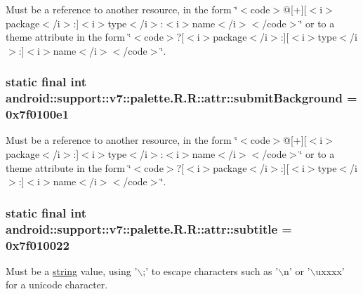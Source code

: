 Must be a reference to another resource, in the form \char`\"{}$<$code$>$@\mbox{[}+\mbox{]}\mbox{[}$<$i$>$package$<$/i$>$:\mbox{]}$<$i$>$type$<$/i$>$:$<$i$>$name$<$/i$>$$<$/code$>$\char`\"{} or to a theme attribute in the form \char`\"{}$<$code$>$?\mbox{[}$<$i$>$package$<$/i$>$:\mbox{]}\mbox{[}$<$i$>$type$<$/i$>$:\mbox{]}$<$i$>$name$<$/i$>$$<$/code$>$\char`\"{}. \hypertarget{classandroid_1_1support_1_1v7_1_1palette_1_1_r_1_1attr_9a36154e856578ee7d0308d8cbef5cb9}{
\subsubsection[{submitBackground}]{\setlength{\rightskip}{0pt plus 5cm}static final int android::support::v7::palette.R.R::attr::submitBackground = 0x7f0100e1}}
\label{classandroid_1_1support_1_1v7_1_1palette_1_1_r_1_1attr_9a36154e856578ee7d0308d8cbef5cb9}


Must be a reference to another resource, in the form \char`\"{}$<$code$>$@\mbox{[}+\mbox{]}\mbox{[}$<$i$>$package$<$/i$>$:\mbox{]}$<$i$>$type$<$/i$>$:$<$i$>$name$<$/i$>$$<$/code$>$\char`\"{} or to a theme attribute in the form \char`\"{}$<$code$>$?\mbox{[}$<$i$>$package$<$/i$>$:\mbox{]}\mbox{[}$<$i$>$type$<$/i$>$:\mbox{]}$<$i$>$name$<$/i$>$$<$/code$>$\char`\"{}. \hypertarget{classandroid_1_1support_1_1v7_1_1palette_1_1_r_1_1attr_c36c0198b02f965b4485fc62fcb0ff25}{
\subsubsection[{subtitle}]{\setlength{\rightskip}{0pt plus 5cm}static final int android::support::v7::palette.R.R::attr::subtitle = 0x7f010022}}
\label{classandroid_1_1support_1_1v7_1_1palette_1_1_r_1_1attr_c36c0198b02f965b4485fc62fcb0ff25}


Must be a \hyperlink{classandroid_1_1support_1_1v7_1_1palette_1_1_r_1_1string}{string} value, using '$\backslash$;' to escape characters such as '$\backslash$n' or '$\backslash$uxxxx' for a unicode character. 

